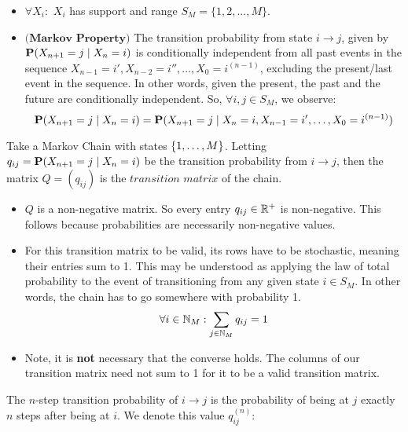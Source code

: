 \begin{itemize}
\item $\forall X_i:$ $X_i$ has support and range $S_M = \{1,2,...,M\}$.
\item $\textbf{(Markov Property)}$ The transition probability from state $i \to j$, given by $\Prb(X_{n+1} = j \mid X_n = i)$ is conditionally independent from all past events in the sequence $X_{n-1} = i',X_{n-2} = i'', \dots,X_0 = i^{(n-1)}$, excluding the present/last event in the sequence. In other words, given the present, the past and the future are conditionally independent. So, $\forall i,j \in S_M$, we observe:
$$ \Prb(X_{n+1} = j \mid X_n = i) = \Prb(X_{n+1} = j \mid X_n = i, X_{n-1} = i', \dots,X_0 = i^{(n-1)})$$
\end{itemize}


\begin{definition}
Take a Markov Chain with states $\{\oneto[M]\}$. Letting $q_{ij} = \P(X_{n+1} = j \mid X_n = i)$ be the transition probability from $i \to j$, then the matrix $Q=(q_{ij})$ is the $\textit{transition matrix}$ of the chain.
\end{definition}

\begin{itemize}
\item $Q$ is a non-negative matrix. So every entry $q_{ij} \in \R^+$ is non-negative. This follows because probabilities are necessarily non-negative values.
\item For this transition matrix to be valid, its rows have to be stochastic, meaning their entries sum to 1. This may be understood as applying the law of total probability to the event of transitioning from any given state $i \in S_M$. In other words, the chain has to go somewhere with probability 1.
$$\forall i \in \N_M: \sum_{j \in \N_M} q_{ij} = 1$$
\item Note, it is \textbf{not} necessary that the converse holds. The columns of our transition matrix need not sum to 1 for it to be a valid transition matrix.
\end{itemize}

\begin{definition} The $n$-step transition probability of $i \to j$ is the probability of being at $j$ exactly $n$ steps after being at $i$. We denote this value $q_{ij}^{(n)}:$
\end{definition}

